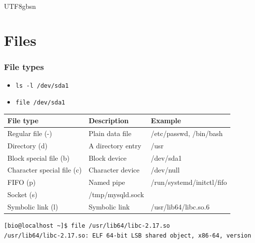 \documentclass[red]{beamer}
\begin{document}
\begin{CJK*}{UTF8}{gbsn}
\section{Files}

\begin{frame}[containsverbatim]
\frametitle{File types}
\begin{itemize}
	\item \lstinline{ls -l /dev/sda1}
	\item \lstinline{file /dev/sda1}
\end{itemize}
\begin{table}[ht]
\scriptsize
\renewcommand\arraystretch{1.6}
\begin{tabular}{lll}
\hline
\textbf{File type} & \textbf{Description} & \textbf{Example} \\
\hline
Regular file (-) & Plain data file & /etc/passwd, /bin/bash \\
Directory (d)& A directory entry & /usr\\
Block special file (b) & Block device & /dev/sda1 \\
Character special file (c) & Character device & /dev/null \\
FIFO (p) & Named pipe & /run/systemd/initctl/fifo \\
Socket (s) & /tmp/mysqld.sock \\
Symbolic link (l) & Symbolic link & /usr/lib64/libc.so.6 \\
\hline
\end{tabular}
\end{table}

\begin{lstlisting}[language=bash,basicstyle=\ttfamily\tiny,]
[bio@localhost ~]$ file /usr/lib64/libc-2.17.so
/usr/lib64/libc-2.17.so: ELF 64-bit LSB shared object, x86-64, version 1 (GNU/Linux), dynamically linked (uses shared libs), BuildID[sha1]=53c0918c85fa9cc08d2b57e76467631ab07554ae, for GNU/Linux 2.6.32, not stripped
\end{lstlisting}

\end{frame}



\end{CJK*}
\end{document}
